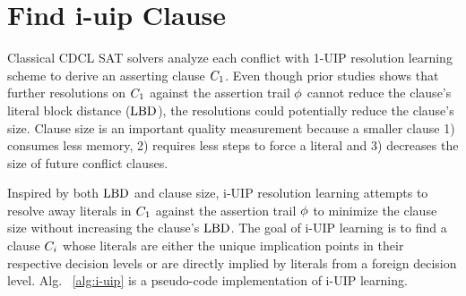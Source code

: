 \section{Find i-uip Clause} \label{sec:i-uip}
Classical CDCL SAT solvers analyze each conflict with 1-UIP resolution learning scheme to derive an asserting clause $C_{1}$. Even though prior studies shows that further resolutions on $C_{1}$ against the assertion trail $\phi$ cannot reduce the clause's literal block distance ($\text{LBD}$), the resolutions could potentially reduce the clause's size. Clause size is an important quality measurement because a smaller clause 1) consumes less memory, 2) requires less steps to force a literal and 3) decreases the size of future conflict clauses.

Inspired by both $\text{LBD}$ and clause size, i-UIP resolution learning attempts to resolve away literals in $C_{1}$ against the assertion trail $\phi$ to minimize the clause size without increasing the clause's $\text{LBD}$. The goal of i-UIP learning is to find a clause $C_{i}$ whose literals are either the unique implication points in their respective decision levels or are directly implied by literals from a foreign decision level. Alg. ~\ref{alg:i-uip} is a pseudo-code implementation of i-UIP learning. 


